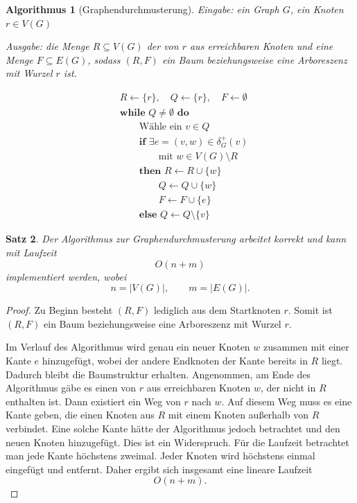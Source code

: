 \documentclass[12pt]{article}
\newtheorem{satz}{Satz}[section]
\newtheorem{algorithmus}[satz]{Algorithmus}
\begin{document}
\begin{algorithmus}[Graphendurchmusterung]

Eingabe: ein Graph \(G\), ein Knoten \(r \in V(G)\)

Ausgabe: die Menge \(R \subseteq V(G)\) der von \(r\) aus erreichbaren Knoten und eine Menge \(F \subseteq E(G)\), sodass \((R,F)\) ein Baum beziehungsweise eine Arboreszenz mit Wurzel \(r\) ist.

\begin{align*}
&R \leftarrow \{r\},\quad Q \leftarrow \{r\},\quad F \leftarrow \emptyset\\
&\textbf{while } Q \neq \emptyset \textbf{ do}\\
&\qquad \text{Wähle ein } v \in Q\\
&\qquad \textbf{if } \exists e=(v,w)\in \delta_G^+(v)\\
&\qquad\qquad \text{mit } w\in V(G)\setminus R\\
&\qquad \textbf{then } R\leftarrow R\cup\{w\}\\
&\qquad\qquad Q\leftarrow Q\cup\{w\}\\
&\qquad\qquad F\leftarrow F\cup\{e\}\\
&\qquad \textbf{else } Q\leftarrow Q\setminus\{v\}
\end{align*}
\end{algorithmus}

\newpage 

\begin{satz}
Der Algorithmus zur Graphendurchmusterung arbeitet korrekt und kann mit Laufzeit
\[
O(n+m)
\]
implementiert werden, wobei
\[
n=|V(G)|,\qquad m=|E(G)|.
\]
\end{satz}

\begin{proof}
Zu Beginn besteht \((R,F)\) lediglich aus dem Startknoten \(r\). Somit ist \((R,F)\) ein Baum beziehungsweise eine Arboreszenz mit Wurzel \(r\).

Im Verlauf des Algorithmus wird genau ein neuer Knoten \(w\) zusammen mit einer Kante \(e\) hinzugefügt, wobei der andere Endknoten der Kante bereits in \(R\) liegt. Dadurch bleibt die Baumstruktur erhalten.
Angenommen, am Ende des Algorithmus gäbe es einen von \(r\) aus erreichbaren Knoten \(w\), der nicht in \(R\) enthalten ist. Dann existiert ein Weg von \(r\) nach \(w\). Auf diesem Weg muss es eine Kante geben, die einen Knoten aus \(R\) mit einem Knoten außerhalb von \(R\) verbindet. Eine solche Kante hätte der Algorithmus jedoch betrachtet und den neuen Knoten hinzugefügt. Dies ist ein Widerspruch.
Für die Laufzeit betrachtet man jede Kante höchstens zweimal. Jeder Knoten wird höchstens einmal eingefügt und entfernt. Daher ergibt sich insgesamt eine lineare Laufzeit
\[
O(n+m).
\]
\end{proof}
\end{document}
